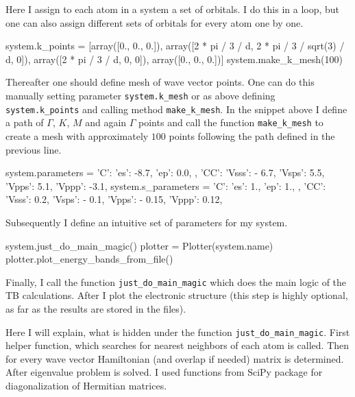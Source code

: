 Here I assign to each atom in a system a set of orbitals. I do this in a loop, but one can also assign different sets of orbitals for every atom one by one.

\begin{python}
system.k_points = [array([0., 0., 0.]),
                   array([2 * pi / 3 / d, 2 * pi / 3 / sqrt(3) / d, 0]),
                   array([2 * pi / 3 / d, 0, 0]),
                   array([0., 0., 0.])]
system.make_k_mesh(100)
\end{python}

Thereafter one should define mesh of wave vector points. One can do this manually setting parameter \verb!system.k_mesh! or as above defining \verb!system.k_points! and calling method \verb!make_k_mesh!. In the snippet above I define a path of $\Gamma$, $K$, $M$ and again $\Gamma$ points and call the function \verb!make_k_mesh! to create a mesh with approximately $100$ points following the path defined in the previous line.

\begin{python}
system.parameters = {
    'C': {
        'es': -8.7,
        'ep': 0.0,
    },
    'CC': {
        'Vsss': - 6.7,
        'Vsps': 5.5,
        'Vpps': 5.1,
        'Vppp': -3.1,
    }
}
system.s_parameters = {
    'C': {
        'es': 1.,
        'ep': 1.,
    },
    'CC': {
        'Vsss': 0.2,
        'Vsps': - 0.1,
        'Vpps': - 0.15,
        'Vppp': 0.12,
    }
}
\end{python}

Subsequently I define an intuitive set of parameters for my system.

\begin{python}
system.just_do_main_magic()
plotter = Plotter(system.name)
plotter.plot_energy_bands_from_file()
\end{python}

Finally, I call the function \verb!just_do_main_magic! which does the main logic of the TB calculations. After I plot the electronic structure (this step is highly optional, as far as the results are stored in the files).

Here I will explain, what is hidden under the function \verb!just_do_main_magic!. First helper function, which searches for nearest neighbors of each atom is called. Then for every wave vector Hamiltonian (and overlap if needed) matrix is determined. After eigenvalue problem is solved. I used functions from SciPy package for diagonalization of Hermitian matrices.
